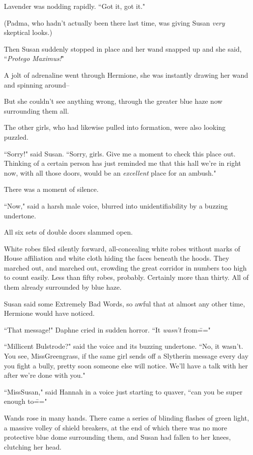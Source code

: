 Lavender was nodding rapidly. ``Got it, got it."

(Padma, who hadn't actually been there last time, was giving Susan \emph{very} skeptical looks.)

Then Susan suddenly stopped in place and her wand snapped up and she said, ``\emph{Protego Maximus!}"

A jolt of adrenaline went through Hermione, she was instantly drawing her wand and spinning around\---

But she couldn't see anything wrong, through the greater blue haze now surrounding them all.

The other girls, who had likewise pulled into formation, were also looking puzzled.

``Sorry!" said Susan. ``Sorry, girls. Give me a moment to check this place out. Thinking of a certain person has just reminded me that this hall we're in right now, with all those doors, would be an \emph{excellent} place for an ambush."

There was a moment of silence.

``Now," said a harsh male voice, blurred into unidentifiability by a buzzing undertone.

All six sets of double doors slammed open.

White robes filed silently forward, all-concealing white robes without marks of House affiliation and white cloth hiding the faces beneath the hoods. They marched out, and marched out, crowding the great corridor in numbers too high to count easily. Less than fifty robes, probably. Certainly more than thirty. All of them already surrounded by blue haze.

Susan said some Extremely Bad Words, so awful that at almost any other time, Hermione would have noticed.

``That message!" Daphne cried in sudden horror. ``It \emph{wasn't} from\==="

``Millicent Bulstrode?" said the voice and its buzzing undertone. ``No, it wasn't. You see, Miss\?Greengrass, if the same girl sends off a Slytherin message every day you fight a bully, pretty soon someone else will notice. We'll have a talk with her after we're done with you."

``Miss\?Susan," said Hannah in a voice just starting to quaver, ``can you be super enough to\==="

Wands rose in many hands. There came a series of blinding flashes of green light, a massive volley of shield breakers, at the end of which there was no more protective blue dome surrounding them, and Susan had fallen to her knees, clutching her head.

